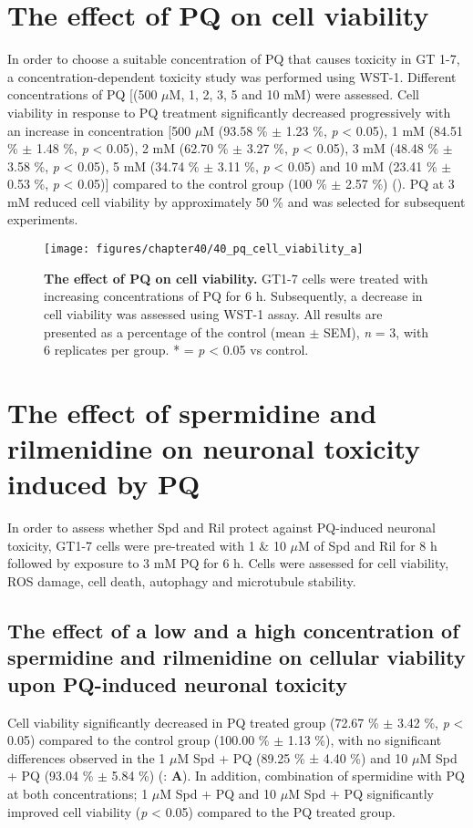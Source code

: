 \section{The effect of PQ on cell viability}
In order to choose a suitable concentration of PQ that causes toxicity in GT 1-7, a concentration-dependent toxicity study was performed using WST-1. Different concentrations of PQ [(500 $\mu$M, 1, 2, 3, 5 and 10 mM) were assessed. Cell viability in response to PQ treatment significantly decreased progressively with an increase in concentration [500 $\mu$M (93.58 \% $\pm$ 1.23 \%, \textit{p} < 0.05), 1 mM (84.51 \% $\pm$ 1.48 \%, \textit{p} < 0.05), 2 mM (62.70 \% $\pm$ 3.27 \%, \textit{p} < 0.05), 3 mM (48.48 \% $\pm$ 3.58 \%, \textit{p} < 0.05), 5 mM (34.74 \% $\pm$ 3.11 \%, \textit{p} < 0.05) and 10 mM (23.41 \% $\pm$ 0.53 \%, \textit{p} < 0.05)] compared to the control group (100 \% $\pm$ 2.57 \%) (). PQ at 3 mM reduced cell viability by approximately 50 \% and was selected for subsequent experiments.

\begin{figure}[!htbp]
\center
  \texttt{[image: figures/chapter40/40\_pq\_cell\_viability\_a]}
  \caption[The effect of PQ on cell viability]{\textbf{The effect of PQ on cell viability.} GT1-7 cells were treated with increasing concentrations of PQ for 6 h. Subsequently, a decrease in cell viability was assessed using WST-1 assay. All results are presented as a percentage of the control (mean $\pm$ SEM), \textit{n} = 3, with 6 replicates per group. * = \textit{p} < 0.05 vs control.}
  \label{fig:40_pq_cell_viability_a}
\end{figure} 

\section{The effect of spermidine and rilmenidine on neuronal toxicity induced by PQ}
In order to assess whether Spd and Ril protect against PQ-induced neuronal toxicity, GT1-7 cells were pre-treated with 1 \& 10 $\mu$M of Spd and Ril for 8 h followed by exposure to 3 mM PQ for 6 h. Cells were assessed for cell viability, ROS damage, cell death, autophagy and microtubule stability.

\subsection{The effect of a low and a high concentration of spermidine and rilmenidine on cellular viability upon PQ-induced neuronal toxicity} 
Cell viability significantly decreased in PQ treated group (72.67 \% $\pm$ 3.42 \%, \textit{p} < 0.05) compared to the control group (100.00 \% $\pm$ 1.13 \%), with no significant differences observed in the 1 $\mu$M Spd + PQ (89.25 \% ± 4.40 \%) and 10 $\mu$M Spd + PQ (93.04 \% $\pm$ 5.84 \%) (: \textbf{A}). In addition, combination of spermidine with PQ at both concentrations; 1 $\mu$M Spd + PQ and 10 $\mu$M Spd + PQ significantly improved cell viability (\textit{p} < 0.05) compared to the PQ treated group. 

